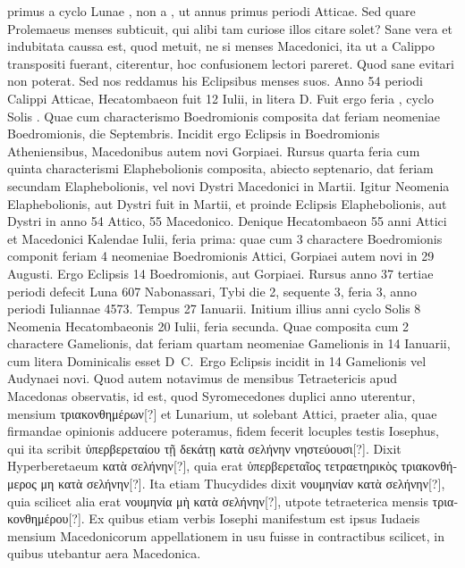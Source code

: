 primus a cyclo Lunae , non a
, ut annus primus periodi Atticae.
Sed quare Prolemaeus menses
subticuit, qui alibi tam curiose illos citare solet?
Sane vera et indubitata
caussa est, quod metuit, ne si menses Macedonici, ita ut a Calippo
transpositi fuerant, citerentur, hoc confusionem lectori pareret.
%
Quod
sane evitari non poterat.
Sed nos reddamus his Eclipsibus menses suos.
Anno 54 periodi Calippi Atticae, Hecatombaeon fuit 12 Iulii, in litera
D.
Fuit ergo feria , cyclo Solis .
Quae cum characterismo Boedromionis
composita dat feriam  neomeniae Boedromionis,
 die  Septembris.
Incidit ergo Eclipsis in  Boedromionis Atheniensibus,
Macedonibus autem novi Gorpiaei.
Rursus quarta feria cum quinta characterismi
Elaphebolionis composita, abiecto septenario, dat feriam
secundam Elaphebolionis, vel novi Dystri Macedonici in  Martii.
Igitur
Neomenia Elaphebolionis, aut Dystri fuit in  Martii, et proinde
Eclipsis  Elaphebolionis, aut Dystri in anno 54 Attico, 55
Macedonico.
Denique Hecatombaeon 55 anni Attici et Macedonici Kalendae
Iulii, feria prima: quae cum 3 charactere Boedromionis componit
feriam 4 neomeniae Boedromionis Attici, Gorpiaei autem novi in
29 Augusti.
Ergo Eclipsis 14 Boedromionis, aut Gorpiaei.
Rursus anno
37 tertiae periodi defecit Luna 607 Nabonassari, Tybi die 2, sequente
3, feria 3, anno periodi Iuliannae 4573.
Tempus 27 Ianuarii.
Initium
illius anni cyclo Solis 8 Neomenia Hecatombaeonis 20 Iulii, feria
secunda.
Quae composita cum 2 charactere Gamelionis, dat feriam quartam
neomeniae Gamelionis in 14 Ianuarii, cum litera Dominicalis esset
D~C.\ 
Ergo Eclipsis incidit in 14 Gamelionis vel Audynaei novi.
\lnr{24}Quod autem notavimus de mensibus Tetraetericis apud Macedonas
observatis, id est, quod Syromecedones duplici anno uterentur, mensium
\textgreek{τριακονθημέρων[?]}
 et Lunarium, ut solebant Attici, praeter alia, quae firmandae
opinionis adducere poteramus, fidem fecerit locuples testis Iosephus,
qui ita scribit
 \textgreek{ὑπερβερεταίου τῇ δεκάτῃ κατὰ σελήνην νηστεύουσι[?]}.
\lnr{27}Dixit Hyperberetaeum
\textgreek{κατὰ σελήνην[?]}, quia erat
 \textgreek{ὑπερβερεταῖος τετραετηρικὸς τριακονθήμερος
μη κατὰ σελήνην[?]}.
Ita etiam Thucydides dixit \textgreek{νουμηνίαν κατὰ σελήνην[?]},
quia scilicet alia erat \textgreek{νουμηνία μὴ κατὰ σελήνην[?]},
 utpote tetraeterica mensis
\textgreek{τριακονθημέρου[?]}.
Ex quibus etiam verbis Iosephi manifestum est ipsus Iudaeis
mensium Macedonicorum appellationem in usu fuisse in contractibus
scilicet, in quibus utebantur aera Macedonica.
%
